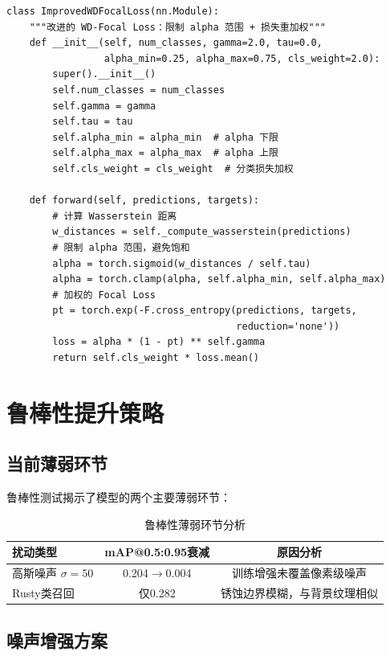 \documentclass[12pt,a4paper]{ctexart}
\theoremstyle{cumcm}
\begin{document}
\begin{lstlisting}
class ImprovedWDFocalLoss(nn.Module):
    """改进的 WD-Focal Loss：限制 alpha 范围 + 损失重加权"""
    def __init__(self, num_classes, gamma=2.0, tau=0.0,
                 alpha_min=0.25, alpha_max=0.75, cls_weight=2.0):
        super().__init__()
        self.num_classes = num_classes
        self.gamma = gamma
        self.tau = tau
        self.alpha_min = alpha_min  # alpha 下限
        self.alpha_max = alpha_max  # alpha 上限
        self.cls_weight = cls_weight  # 分类损失加权

    def forward(self, predictions, targets):
        # 计算 Wasserstein 距离
        w_distances = self._compute_wasserstein(predictions)
        # 限制 alpha 范围，避免饱和
        alpha = torch.sigmoid(w_distances / self.tau)
        alpha = torch.clamp(alpha, self.alpha_min, self.alpha_max)
        # 加权的 Focal Loss
        pt = torch.exp(-F.cross_entropy(predictions, targets,
                                        reduction='none'))
        loss = alpha * (1 - pt) ** self.gamma
        return self.cls_weight * loss.mean()
\end{lstlisting}

\section{鲁棒性提升策略}

\subsection{当前薄弱环节}

鲁棒性测试揭示了模型的两个主要薄弱环节：

\begin{table}[H]
\centering
{}
\caption{鲁棒性薄弱环节分析}
\begin{tabular}{lcc}
\toprule
\textbf{扰动类型} & \textbf{mAP@0.5:0.95衰减} & \textbf{原因分析} \\
\midrule
高斯噪声 $\sigma=50$ & 0.204$\to$0.004 & 训练增强未覆盖像素级噪声 \\
Rusty类召回 & 仅0.282 & 锈蚀边界模糊，与背景纹理相似 \\
\bottomrule
\end{tabular}
\end{table}

\subsection{噪声增强方案}
\end{document}
